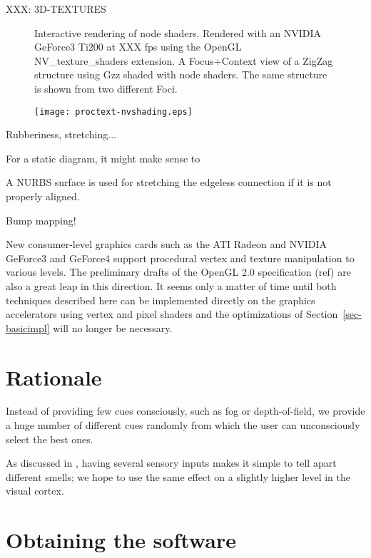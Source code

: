 \documentclass[twocolumn]{IV02}
\begin{document}
XXX: 3D-TEXTURES

\begin{figure*}
\fbox{\vbox{\vskip 4in}}
\caption{
\label{fig-proctext-argh}
Interactive rendering of node shaders. 
Rendered with an NVIDIA GeForce3 Ti200 at XXX fps using 
the OpenGL NV\_texture\_shaders extension.
A Focus+Context view of a ZigZag structure using Gzz 
shaded with node shaders. The same structure is shown from two different
Foci.
}
\end{figure*}

\begin{figure*}
\centering
\texttt{[image: proctext-nvshading.eps]}
\caption{
}
\label{fig-proctext-nvshading}
\end{figure*}

Rubberiness, stretching...


For a static diagram, it might make sense to 

A NURBS surface is used for stretching the edgeless connection if
it is not properly aligned.

Bump mapping!

New consumer-level 
graphics cards such as the ATI Radeon and NVIDIA GeForce3 and GeForce4
support procedural vertex and texture manipulation to various levels. 
\cite{proudfoot01realtime}
The preliminary drafts of the OpenGL 2.0 specification (ref) are also
a great leap in this direction.
It seems only a matter of time until both techniques described
here can be implemented directly on the graphics accelerators using
vertex and pixel shaders and the optimizations of Section~\ref{sec-basicimpl}
will no longer be necessary.

\section{Rationale}

Instead of providing few cues consciously, such as fog or depth-of-field,
we provide a huge number of different cues randomly from which the user
can unconsciously select the best ones.

As discussed in \cite{hopfield01olfaction}, having several sensory inputs
makes it simple to tell apart different smells; we hope to use the same effect
on a slightly higher level in the visual cortex.

\section{Obtaining the software}
\end{document}
